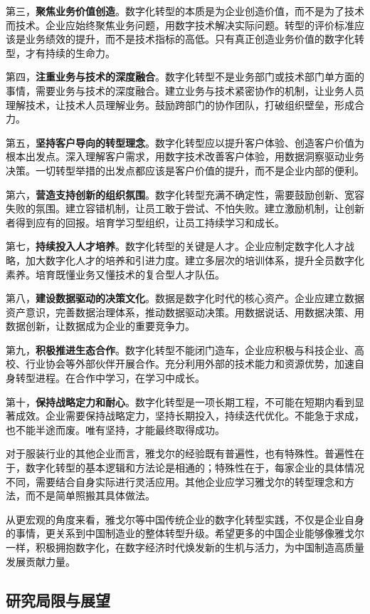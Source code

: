 \documentclass[12pt,a4paper]{article}
\begin{document}
第三，\textbf{聚焦业务价值创造}。数字化转型的本质是为企业创造价值，而不是为了技术而技术。企业应始终聚焦业务问题，用数字技术解决实际问题。转型的评价标准应该是业务绩效的提升，而不是技术指标的高低。只有真正创造业务价值的数字化转型，才有持续的生命力。

第四，\textbf{注重业务与技术的深度融合}。数字化转型不是业务部门或技术部门单方面的事情，需要业务与技术的深度融合。建立业务与技术紧密协作的机制，让业务人员理解技术，让技术人员理解业务。鼓励跨部门的协作团队，打破组织壁垒，形成合力。

第五，\textbf{坚持客户导向的转型理念}。数字化转型应以提升客户体验、创造客户价值为根本出发点。深入理解客户需求，用数字技术改善客户体验，用数据洞察驱动业务决策。一切转型举措的出发点都应该是客户价值的提升，而不是企业内部的便利。

第六，\textbf{营造支持创新的组织氛围}。数字化转型充满不确定性，需要鼓励创新、宽容失败的氛围。建立容错机制，让员工敢于尝试、不怕失败。建立激励机制，让创新者得到应有的回报。培育学习型组织，让员工持续学习和成长。

第七，\textbf{持续投入人才培养}。数字化转型的关键是人才。企业应制定数字化人才战略，加大数字化人才的培养和引进力度。建立多层次的培训体系，提升全员数字化素养。培育既懂业务又懂技术的复合型人才队伍。

第八，\textbf{建设数据驱动的决策文化}。数据是数字化时代的核心资产。企业应建立数据资产意识，完善数据治理体系，推动数据驱动决策。用数据说话、用数据决策、用数据创新，让数据成为企业的重要竞争力。

第九，\textbf{积极推进生态合作}。数字化转型不能闭门造车，企业应积极与科技企业、高校、行业协会等外部伙伴开展合作。充分利用外部的技术能力和资源优势，加速自身转型进程。在合作中学习，在学习中成长。

第十，\textbf{保持战略定力和耐心}。数字化转型是一项长期工程，不可能在短期内看到显著成效。企业需要保持战略定力，坚持长期投入，持续迭代优化。不能急于求成，也不能半途而废。唯有坚持，才能最终取得成功。

对于服装行业的其他企业而言，雅戈尔的经验既有普遍性，也有特殊性。普遍性在于，数字化转型的基本逻辑和方法论是相通的；特殊性在于，每家企业的具体情况不同，需要结合自身实际进行灵活应用。其他企业应学习雅戈尔的转型理念和方法，而不是简单照搬其具体做法。

从更宏观的角度来看，雅戈尔等中国传统企业的数字化转型实践，不仅是企业自身的事情，更关系到中国制造业的整体转型升级。希望更多的中国企业能够像雅戈尔一样，积极拥抱数字化，在数字经济时代焕发新的生机与活力，为中国制造高质量发展贡献力量。

\subsection{研究局限与展望}
\end{document}
